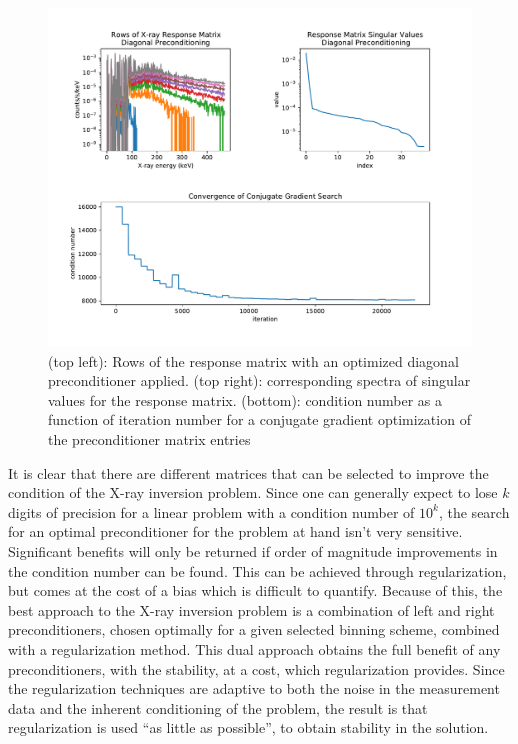 \begin{figure}[p]
    \centering
    \includegraphics[width=1.1\textwidth]{figures/chapter_4/optimization_left_preconditioner/fig.pdf}
    \caption{(top left): Rows of the response matrix with an optimized diagonal preconditioner applied. (top right): corresponding spectra of singular values for the response matrix. (bottom): condition number as a function of iteration number for a conjugate gradient optimization of the preconditioner matrix entries}
    \label{optimized_left_preconditioner}
\end{figure}

It is clear that there are different matrices that can be selected to improve the condition of the X-ray inversion problem. Since one can generally expect to lose $k$ digits of precision for a linear problem with a condition number of $10^k$, the search for an optimal preconditioner for the problem at hand isn't very sensitive. Significant benefits will only be returned if order of magnitude improvements in the condition number can be found. This can be achieved through regularization, but comes at the cost of a bias which is difficult to quantify. Because of this, the best approach to the X-ray inversion problem is a combination of left and right preconditioners, chosen optimally for a given selected binning scheme, combined with a regularization method. This dual approach obtains the full benefit of any preconditioners, with the stability, at a cost, which regularization provides. Since the regularization techniques are adaptive to both the noise in the measurement data and the inherent conditioning of the problem, the result is that regularization is used ``as little as possible'', to obtain stability in the solution. 

